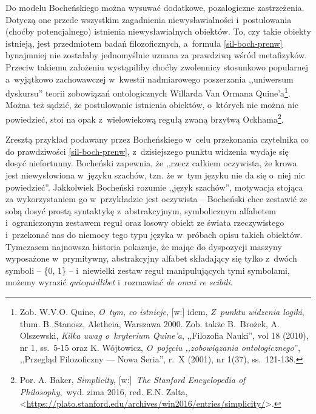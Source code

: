 Do modelu Bocheńskiego można wysuwać dodatkowe, pozalogiczne zastrzeżenia. Dotyczą one przede wszystkim zagadnienia niewysławialności i~postulowania (choćby potencjalnego) istnienia niewysławialnych obiektów. To, czy takie obiekty istnieją, jest przedmiotem badań filozoficznych, a~formuła \eqref{sil-boch-prenw} bynajmniej nie zostałaby jednomyślnie uznana za prawdziwą wśród metafizyków. Przeciw takiemu założeniu wystąpiliby choćby zwolennicy stosunkowo popularnej a~wyjątkowo zachowawczej w~kwestii nadmiarowego poszerzania ,,uniwersum dyskursu'' teorii zobowiązań ontologicznych Willarda Van Ormana Quine'a\footnote{Zob. W.V.O. Quine, \textit{O~tym, co istnieje}, [w:] idem, \textit{Z~punktu widzenia logiki}, tłum. B. Stanosz, Aletheia, Warszawa 2000. Zob. także B.~Brożek, A. Olszewski, \textit{Kilka uwag o~kryterium Quine'a}, ,,Filozofia Nauki'', vol 18 (2010), nr 1, ss.~5-15 oraz K. Wójtowicz, \textit{O~pojęciu ,,zobowiązania ontologicznego}'', ,,Przegląd Filozoficzny — Nowa Seria'', r.~X (2001), nr 1(37), ss.~121-138.}. Można też sądzić, że postulowanie istnienia obiektów, o~których nie można nic powiedzieć, stoi na opak z~wielowiekową regułą zwaną brzytwą Ockhama\footnote{Por. A. Baker, \textit{Simplicity}, [w:]~\textit{The Stanford Encyclopedia of Philosophy},~wyd. zima 2016, red. E.N. Zalta, {\textless}\url{https://plato.stanford.edu/archives/win2016/entries/simplicity/}{\textgreater}.}.

Zresztą przykład podawany przez Bocheńskiego w~celu przekonania czytelnika co do prawdziwości \eqref{sil-boch-prenw}, z~dzisiejszego punktu widzenia wydaje się dosyć niefortunny. Bocheński zapewnia, że ,,rzecz całkiem oczywista, że krowa jest niewysłowiona w~języku szachów, tzn. że w~tym języku nie da się o~niej nic powiedzieć''. Jakkolwiek Bocheński rozumie ,,język szachów'', motywacja stojąca za wykorzystaniem go w~przykładzie jest oczywista -- Bocheński chce zestawić ze sobą dosyć prostą syntaktykę z~abstrakcyjnym, symbolicznym alfabetem i~ograniczonym zestawem reguł oraz losowy obiekt ze świata rzeczywistego i~przekonać nas do niemocy tego typu języka w~próbach opisu takich obiektów. Tymczasem najnowsza historia pokazuje, że mając do dyspozycji maszyny wyposażone w~prymitywny, abstrakcyjny alfabet składający się tylko z~dwóch symboli -- \{0, 1\} -- i~niewielki zestaw reguł manipulujących tymi symbolami, możemy wyrazić \textit{quicquidlibet} i~rozmawiać \textit{de omni re scibili}.

